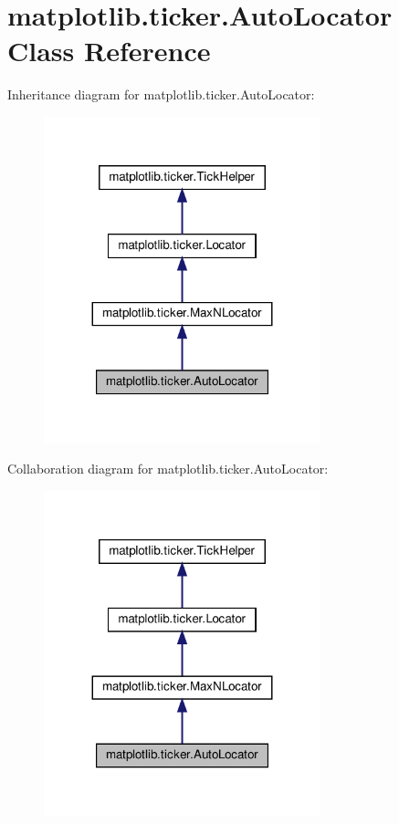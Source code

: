 \hypertarget{classmatplotlib_1_1ticker_1_1AutoLocator}{}\section{matplotlib.\+ticker.\+Auto\+Locator Class Reference}
\label{classmatplotlib_1_1ticker_1_1AutoLocator}


Inheritance diagram for matplotlib.\+ticker.\+Auto\+Locator\+:
\nopagebreak
\begin{figure}[H]
\begin{center}
\leavevmode
\includegraphics[width=227pt]{classmatplotlib_1_1ticker_1_1AutoLocator__inherit__graph}
\end{center}
\end{figure}


Collaboration diagram for matplotlib.\+ticker.\+Auto\+Locator\+:
\nopagebreak
\begin{figure}[H]
\begin{center}
\leavevmode
\includegraphics[width=227pt]{classmatplotlib_1_1ticker_1_1AutoLocator__coll__graph}
\end{center}
\end{figure}
